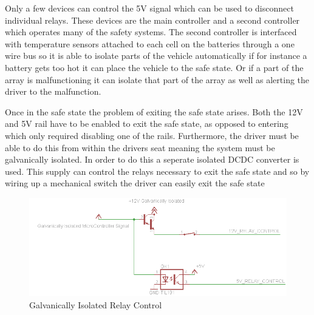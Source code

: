 Only a few devices can control the 5V signal which can be used to disconnect individual relays. These devices are the main controller and a second controller which operates many of the safety systems. The second controller is interfaced with temperature sensors attached to each cell on the batteries through a one wire bus so it is able to isolate parts of the vehicle automatically if for instance a battery gets too hot it can place the vehicle to the safe state. Or if a part of the array is malfunctioning it can isolate that part of the array as well as alerting the driver to the malfunction.

Once in the safe state the problem of exiting the safe state arises. Both the 12V and 5V rail have to be enabled to exit the safe state, as opposed to entering which only required disabling one of the rails. Furthermore, the driver must be able to do this from within the drivers seat meaning the system must be galvanically isolated. In order to do this a seperate isolated DCDC converter is used. This supply can control the relays necessary to exit the safe state and so by wiring up a mechanical switch the driver can easily exit the safe state

\begin{figure}[H]
\includegraphics[width=\columnwidth]{figures/SafeStateIsolated.png}%
\caption{Galvanically Isolated Relay Control}
\label{Fig:IsolatedControl}
\end{figure}
